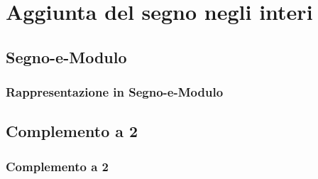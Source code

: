 \documentclass{beamer}
\begin{document}
  \section[NegativeRep]{Aggiunta del segno negli interi}
  \subsection{Segno-e-Modulo}
  \begin{frame}
    \frametitle{Rappresentazione in Segno-e-Modulo}
  \end{frame}
  \subsection{Complemento a 2}
  \begin{frame}
    \frametitle{Complemento a 2}
  \end{frame}
\end{document}
